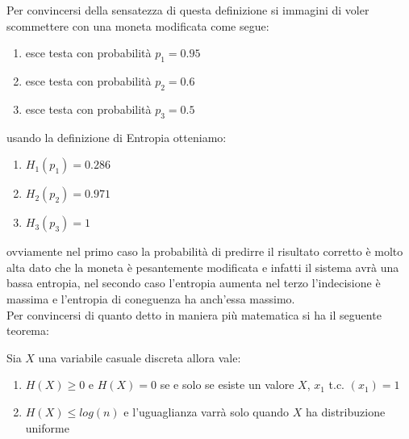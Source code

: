 Per convincersi della sensatezza di questa definizione si immagini di voler scommettere con una moneta modificata come segue:
\begin{enumerate}
\item esce testa con probabilità $p_1=0.95$
\item esce testa con probabilità $p_2=0.6$
\item esce testa con probabilità $p_3=0.5$
\end{enumerate} 
 usando la definizione di Entropia otteniamo:
 
 \begin{enumerate}
\item$H_1(p_1)=0.286$
\item$H_2(p_2)=0.971$
\item$H_3(p_3)=1$
\end{enumerate}
ovviamente nel primo caso la probabilità di predirre il risultato corretto è molto alta dato che la moneta è pesantemente modificata e infatti il sistema avrà una bassa entropia, nel secondo caso l'entropia aumenta nel terzo l'indecisione è massima e l'entropia di coneguenza ha anch'essa massimo.\\
Per convincersi di quanto detto in maniera più matematica si ha il seguente teorema:
\begin{teo} \label{teo:6.2}
Sia $X$ una variabile casuale discreta allora vale:
\begin{enumerate}
\item $H(X)\geq 0$ e $H(X)= 0$ se e solo se esiste un valore $X$, $x_1$ t.c. \p$(x_1)=1$
\item $H(X)\leq log(n)$ e l'uguaglianza varrà solo quando $X$ ha distribuzione uniforme
\end{enumerate}
\end{teo}
